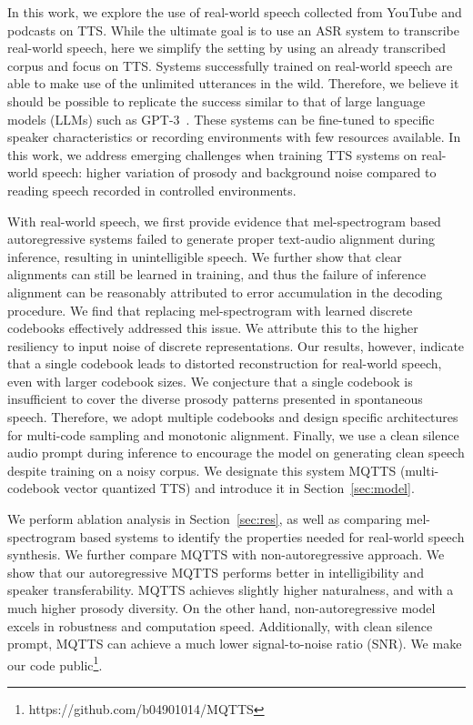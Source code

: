 \documentclass[letterpaper]{article} %
\begin{document}
In this work, we explore the use of real-world speech collected from YouTube and podcasts on TTS.
While the ultimate goal is to use an ASR system to transcribe real-world speech, here we simplify the setting by using an already transcribed corpus and focus on TTS.
Systems successfully trained on real-world speech are able to make use of the unlimited utterances in the wild.
Therefore, we believe it should be possible to replicate the success similar to that of large language models (LLMs) such as GPT-3~\cite{NEURIPS2020_1457c0d6}.
These systems can be fine-tuned to specific speaker characteristics or recording environments with few resources available.
In this work, we address emerging challenges when training TTS systems on real-world speech: higher variation of prosody and background noise compared to reading speech recorded in controlled environments.

With real-world speech, we first provide evidence that mel-spectrogram based autoregressive systems failed to generate proper text-audio alignment during inference, resulting in unintelligible speech.
We further show that clear alignments can still be learned in training, and thus the failure of inference alignment can be reasonably attributed to error accumulation in the decoding procedure.
We find that replacing mel-spectrogram with learned discrete codebooks effectively addressed this issue.
We attribute this to the higher resiliency to input noise of discrete representations.
Our results, however, indicate that a single codebook leads to distorted reconstruction for real-world speech, even with larger codebook sizes.
We conjecture that a single codebook is insufficient to cover the diverse prosody patterns presented in spontaneous speech.
Therefore, we adopt multiple codebooks and design specific architectures for multi-code sampling and monotonic alignment.
Finally, we use a clean silence audio prompt during inference to encourage the model on generating clean speech despite training on a noisy corpus.
We designate this system MQTTS (multi-codebook vector quantized TTS) and introduce it in Section~\ref{sec:model}.

We perform ablation analysis in Section~\ref{sec:res}, as well as comparing mel-spectrogram based systems to identify the properties needed for real-world speech synthesis.
We further compare MQTTS with non-autoregressive approach.
We show that our autoregressive MQTTS performs better in intelligibility and speaker transferability.
MQTTS achieves slightly higher naturalness, and with a much higher prosody diversity.
On the other hand, non-autoregressive model excels in robustness and computation speed.
Additionally, with clean silence prompt, MQTTS can achieve a much lower signal-to-noise ratio (SNR).
We make our code public\footnote{https://github.com/b04901014/MQTTS}.%
\end{document}
